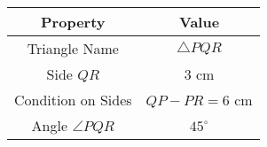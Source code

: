 \begin{tabular}[12pt]{ |c| |c| }
    \hline
    \textbf{Property} & \textbf{Value} \\ 
    \hline
    Triangle Name & $ \triangle PQR $ \\ 
    \hline
    Side $ QR $ & 3 cm \\ 
    \hline
    Condition on Sides & $ QP - PR = 6 $ cm \\ 
    \hline
    Angle $ \angle PQR $ &  $45^\circ $ \\ 
    \hline
\end{tabular}
